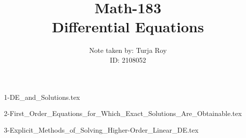 \documentclass[12pt]{article}
\title{
    \textbf{Math-183} \\
    \textbf{Differential Equations}
}
\author{
    Note taken by: Turja Roy \\
    ID: 2108052
}
\date{}
\numberwithin{equation}{subsection}
\begin{document}
\maketitle

\tableofcontents
\pagebreak


{1-DE_and_Solutions.tex}
\pagebreak

{2-First_Order_Equations_for_Which_Exact_Solutions_Are_Obtainable.tex}
\pagebreak

{3-Explicit_Methods_of_Solving_Higher-Order_Linear_DE.tex}
\pagebreak
\end{document}
